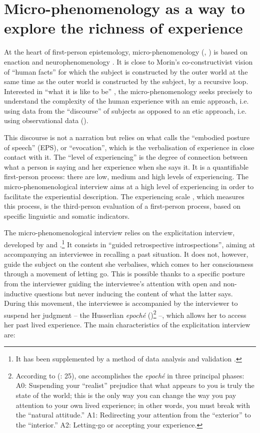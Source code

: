 \documentclass[output=paper]{langscibook}
\begin{document}
\section{Micro-phenomenology as a way to explore the richness of experience}

At the heart of first-person epistemology, micro-phenomenology (\citealt{Petitmengin2006}, \citealt{BitbolPetitmengin2016}) is based on enaction and neurophenomenology \citep{Varela1996}. It is close to Morin's co-constructivist vision of “human facts” \citep{Morin1990a} for which the subject is constructed by the outer world at the same time as the outer world is constructed by the subject, by a recursive loop. Interested in “what it is like to be” \citep{Nagel1974}, the micro-phenomenology seeks precisely to understand the complexity of the human experience with an emic approach, i.e. using data from the “discourse” of subjects as opposed to an etic approach, i.e. using observational data (\citealt{OlivierdeSardan1998}).

This discourse is not a narration but relies on what \citet{Vermersch1994} calls the “embodied posture of speech” (EPS), or “evocation”, which is the verbalisation of experience in close contact with it. The “level of experiencing” \citep{Hendricks2001} is the degree of connection between what a person is saying and her experience when she says it. It is a quantifiable first-person process: there are low, medium and high levels of experiencing. The micro{}-phenomenological interview aims at a high level of experiencing in order to facilitate the experiential description. The experiencing scale \citep{Hendricks2009}, which measures this process, is the third-person evaluation of a first-person process, based on specific linguistic and somatic indicators.  

The micro-phenomenological interview relies on the explicitation interview, developed by \citet{Vermersch2012} and \citet{Petitmengin2006}.\footnote{It has been supplemented by a method of data analysis and validation \citep{PetitmenginEtAl2015,PetitmenginEtAl2018}.} It consists in “guided retrospective introspections”, aiming at accompanying an interviewee in recalling a past situation. It does not, however, guide the subject on the content she verbalises, which comes to her consciousness through a movement of letting go. This is possible thanks to a specific posture from the interviewer guiding the interviewee’s attention with open and non-inductive questions but never inducing the content of what the latter says. During this movement, the interviewee is accompanied by the interviewer to suspend her judgment – the Husserlian \textit{epoché} (\citealt{DeprazEtAl2003})\footnote{According to (\citealt{DeprazEtAl2003}: 25), one accomplishes the \textit{epoché} in three principal phases: A0: Suspending your “realist” prejudice that what appears to you is truly the state of the world; this is the only way you can change the way you pay attention to your own lived experience; in other words, you must break with the “natural attitude.” A1: Redirecting your attention from the “exterior” to the “interior.”
A2: Letting-go or accepting your experience.} –, which allows her to access her past lived experience. The main characteristics of the explicitation interview are: 
\end{document}
